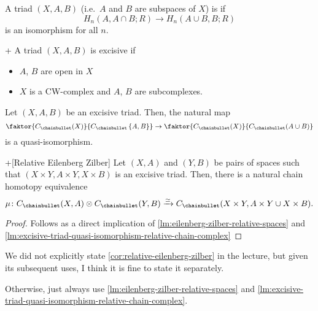 \begin{definition}
  \label{def:excisive-triad}
  A triad $(X,A,B)$ (i.e.~$A$ and  $B$ are subspaces of  $X$)
  is   if
  \[
    H_n(A,A\cap B;R) \to H_n(A\cup B, B ;R)
  \]
  is an isomorphism for all $n$.
\end{definition}

\begin{example}+
  A triad $(X,A,B)$ is excisive if
   \begin{itemize}
    \item $A$,  $B$ are open in  $X$
    \item  $X$ is a  CW-complex and $A$,  $B$ are subcomplexes.
  \end{itemize}
\end{example}

\begin{lemma}
  \label{lm:excisive-triad-quasi-isomorphism-relative-chain-complex}
  Let $(X,A,B)$ be an excisive triad.
  Then, the natural map
   \[
     \faktor{\Csing(X)}{\Csing \set{ A,B } }
     \to
     \faktor{\Csing(X)}{\Csing(A\cup B)}
  \]
  is a quasi-isomorphism.
\end{lemma}

\begin{corollary}+[Relative Eilenberg Zilber]
  \label{cor:relative-eilenberg-zilber}
  Let $(X,A)$ and  $(Y,B)$ be pairs of spaces such that
  $(X\times Y, A\times Y, X\times B)$ is an excisive 
  triad.
  Then, there is a natural chain homotopy equivalence
  \[
    \mu \colon
    \Csing(X,A) \chaintensor \Csing(Y,B)
    \xrightarrow{\simeq}
    \Csing(X\times Y, A\times Y \cup X\times B)
  .\] 
\end{corollary}
\begin{proof}
  Follows as a direct implication of
  \autoref{lm:eilenberg-zilber-relative-spaces}
  and
  \autoref{lm:excisive-triad-quasi-isomorphism-relative-chain-complex} 
\end{proof}

\begin{editor}
  We did not explicitly state
  \autoref{cor:relative-eilenberg-zilber}
  in the lecture, but given its subsequent uses,
  I think it is fine to state it separately.

  Otherwise, just always use
  \autoref{lm:eilenberg-zilber-relative-spaces} 
  and
  \autoref{lm:excisive-triad-quasi-isomorphism-relative-chain-complex}.
\end{editor}

